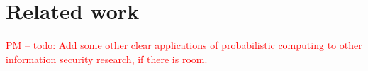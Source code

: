 \documentclass{article} %
\newcommand{\pxm}[1]{\textcolor{red}{PM -- #1}}
\theoremstyle{plain} %
\theoremstyle{definition} %
\begin{document}
\section*{Related work} \pxm{todo: Add some other clear applications
  of probabilistic computing to other information security research,
  if there is room.}





\end{document}
